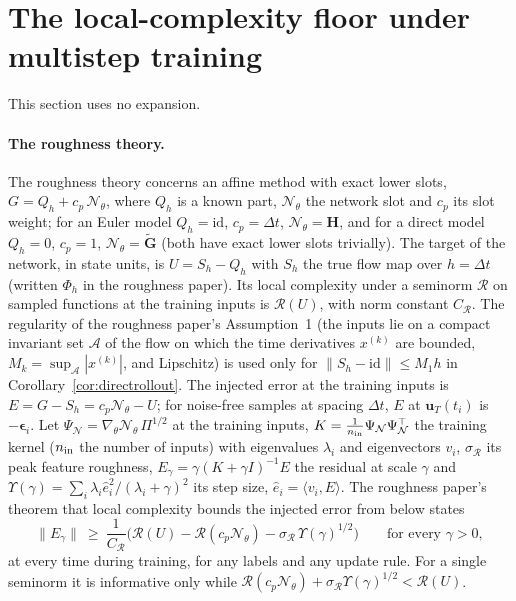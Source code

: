\documentclass[11pt]{article}
\theoremstyle{definition}
\theoremstyle{remark}
\newcommand{\uu}{\mathbf{u}}
\newcommand{\Gt}{\tilde{\mathbf{G}}}
\newcommand{\Hop}{\mathbf{H}}
\newcommand{\eps}{\bm{\epsilon}}
\newcommand{\Rgh}{\mathcal{R}}
\newcommand{\dt}{\Delta t}
\newcommand{\Nn}{\mathcal N_\theta}
\begin{document}
\section{The local-complexity floor under multistep training}\label{sec:floor}

This section uses no expansion.

\paragraph{The roughness theory.}
The roughness theory concerns an affine method with exact lower slots, $G=Q_h+c_p\,\Nn$, where $Q_h$ is a known part, $\Nn$ the network slot and $c_p$ its slot weight; for an Euler model $Q_h=\mathrm{id}$, $c_p=\dt$, $\Nn=\Hop$, and for a direct model $Q_h=0$, $c_p=1$, $\Nn=\Gt$ (both have exact lower slots trivially).
The target of the network, in state units, is $U=S_h-Q_h$ with $S_h$ the true flow map over $h=\dt$ (written $\Phi_h$ in the roughness paper).
Its local complexity under a seminorm $\Rgh$ on sampled functions at the training inputs is $\Rgh(U)$, with norm constant $C_\Rgh$.
The regularity of the roughness paper's Assumption~1 (the inputs lie on a compact invariant set $\mathcal A$ of the flow on which the time derivatives $x^{(k)}$ are bounded, $M_k=\sup_{\mathcal A}|x^{(k)}|$, and Lipschitz) is used only for $\|S_h-\mathrm{id}\|\le M_1h$ in Corollary~\ref{cor:directrollout}.
The injected error at the training inputs is $E=G-S_h=c_p\Nn-U$; for noise-free samples at spacing $\dt$, $E$ at $\uu_T(t_i)$ is $-\eps_i$.
Let $\Psi_{\mathcal N}=\nabla_\theta\Nn\,\Pi^{1/2}$ at the training inputs, $K=\frac1{n_{\rm in}}\Psi_{\mathcal N}\Psi_{\mathcal N}^\top$ the training kernel ($n_{\rm in}$ the number of inputs) with eigenvalues $\lambda_i$ and eigenvectors $v_i$, $\sigma_\Rgh$ its peak feature roughness, $E_\gamma=\gamma(K+\gamma I)^{-1}E$ the residual at scale $\gamma$ and $\Upsilon(\gamma)=\sum_i\lambda_i\hat e_i^2/(\lambda_i+\gamma)^2$ its step size, $\hat e_i=\langle v_i,E\rangle$.
The roughness paper's theorem that local complexity bounds the injected error from below states
\begin{equation}\label{eq:floor}
\|E_\gamma\|\ \ge\ \frac1{C_\Rgh}\Big(\Rgh(U)-\Rgh(c_p\Nn)-\sigma_\Rgh\,\Upsilon(\gamma)^{1/2}\Big)\qquad\text{for every }\gamma>0,
\end{equation}
at every time during training, for any labels and any update rule.
For a single seminorm it is informative only while $\Rgh(c_p\Nn)+\sigma_\Rgh\Upsilon(\gamma)^{1/2}<\Rgh(U)$.
\end{document}
